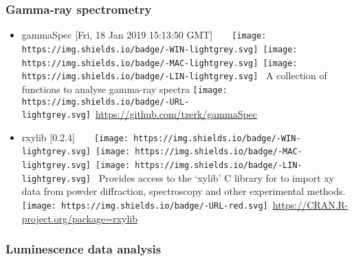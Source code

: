 \documentclass[]{article}
\providecommand{\tightlist}{%
  \setlength{\itemsep}{0pt}\setlength{\parskip}{0pt}}
\begin{document}
\hypertarget{gamma-ray-spectrometry}{%
\subsubsection{Gamma-ray spectrometry}\label{gamma-ray-spectrometry}}

\begin{itemize}
\tightlist
\item
  gammaSpec {[}Fri, 18 Jan 2019 15:13:50 GMT{]}~~~~\texttt{[image: https://img.shields.io/badge/-WIN-lightgrey.svg]}~\texttt{[image: https://img.shields.io/badge/-MAC-lightgrey.svg]}~\texttt{[image: https://img.shields.io/badge/-LIN-lightgrey.svg]}~
  A collection of functions to analyse gamma-ray spectra
  \texttt{[image: https://img.shields.io/badge/-URL-lightgrey.svg]}~\url{https://github.com/tzerk/gammaSpec}
\item
  rxylib {[}0.2.4{]}~~~~\texttt{[image: https://img.shields.io/badge/-WIN-lightgrey.svg]}~\texttt{[image: https://img.shields.io/badge/-MAC-lightgrey.svg]}~\texttt{[image: https://img.shields.io/badge/-LIN-lightgrey.svg]}~
  Provides access to the `xylib' C library for to import xy
  data from powder diffraction, spectroscopy and other experimental methods.
  \texttt{[image: https://img.shields.io/badge/-URL-red.svg]}~\url{https://CRAN.R-project.org/package=rxylib}
\end{itemize}

\hypertarget{luminescence-data-analysis}{%
\subsubsection{Luminescence data analysis}\label{luminescence-data-analysis}}
\end{document}
